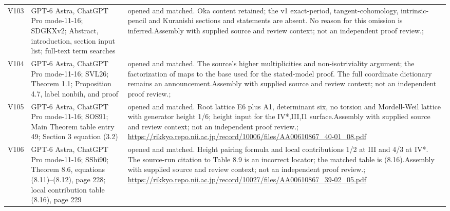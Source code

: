 \documentclass[11pt,a4paper]{article}
\theoremstyle{plain}
\theoremstyle{definition}
\begin{document}
\begin{longtable}{@{}L{.08\linewidth}L{.31\linewidth}L{.56\linewidth}@{}}
V103 & GPT-6 Astra, ChatGPT Pro mode-11-16; S\newline DGKXv2; Abstract, introduction, section input list; full-text term searches & opened and matched. Oka content retained; the v1 exact-period, tangent-cohomology, intrinsic-pencil and Kuranishi sections and statements are absent. No reason for this omission is inferred.\newline Assembly with supplied source and review context; not an independent proof review.\newline {}; \\
V104 & GPT-6 Astra, ChatGPT Pro mode-11-16; S\newline VL26; Theorem 1.1; Proposition 4.7, label nonbih, and proof & opened and matched. The source's higher multiplicities and non-isotriviality argument; the factorization of maps to the base used for the stated-model proof. The full coordinate dictionary remains an announcement.\newline Assembly with supplied source and review context; not an independent proof review.\newline {}; \\
V105 & GPT-6 Astra, ChatGPT Pro mode-11-16; S\newline OS91; Main Theorem table entry 49; Section 3 equation (3.2) & opened and matched. Root lattice E6 plus A1, determinant six, no torsion and Mordell-Weil lattice with generator height 1/\allowbreak{}6; height input for the IV*,III,I1 surface.\newline Assembly with supplied source and review context; not an independent proof review.\newline {}; \url{https://rikkyo.repo.nii.ac.jp/record/10006/files/AA00610867_40-01_08.pdf}\\
V106 & GPT-6 Astra, ChatGPT Pro mode-11-16; S\newline Shi90; Theorem 8.6, equations (8.11)--(8.12), page 228; local contribution table (8.16), page 229 & opened and matched. Height pairing formula and local contributions 1/\allowbreak{}2 at III and 4/\allowbreak{}3 at IV*. The source-run citation to Table 8.9 is an incorrect locator; the matched table is (8.16).\newline Assembly with supplied source and review context; not an independent proof review.\newline {}; \url{https://rikkyo.repo.nii.ac.jp/record/10027/files/AA00610867_39-02_05.pdf}\\

\end{longtable}
\end{document}
